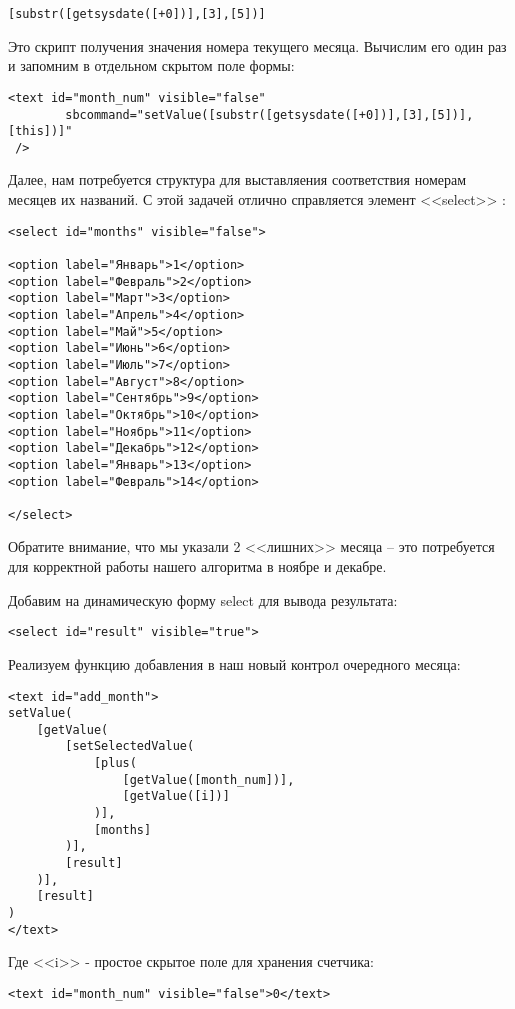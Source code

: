 \documentclass[../index.tex]{subfiles}
\begin{document}
\begin{verbatim}
[substr([getsysdate([+0])],[3],[5])]
\end{verbatim}

Это скрипт получения значения номера текущего месяца.
Вычислим его один раз и запомним в отдельном скрытом поле формы:

\begin{verbatim}
<text id="month_num" visible="false"
        sbcommand="setValue([substr([getsysdate([+0])],[3],[5])],[this])]" 
 />
\end{verbatim}

Далее, нам потребуется структура для выставляения соответствия номерам месяцев их названий. С этой задачей отлично справляется элемент <<select>> :

\begin{verbatim}
<select id="months" visible="false"> 

<option label="Январь">1</option>
<option label="Февраль">2</option>
<option label="Март">3</option>
<option label="Апрель">4</option>
<option label="Май">5</option>
<option label="Июнь">6</option>
<option label="Июль">7</option>
<option label="Август">8</option>
<option label="Сентябрь">9</option>
<option label="Октябрь">10</option>
<option label="Ноябрь">11</option>
<option label="Декабрь">12</option>
<option label="Январь">13</option>
<option label="Февраль">14</option>

</select>
\end{verbatim}

Обратите внимание, что мы указали 2 <<лишних>> месяца -- это потребуется для корректной работы нашего алгоритма в ноябре и декабре.

Добавим на динамическую форму select для вывода результата:
\begin{verbatim}
<select id="result" visible="true"> 
\end{verbatim}

Реализуем функцию добавления в наш новый контрол очередного месяца:

\begin{verbatim}
<text id="add_month">
setValue(
    [getValue(
        [setSelectedValue(
            [plus(
                [getValue([month_num])],
                [getValue([i])]
            )], 
            [months]
        )],
        [result]
    )],
    [result]
)
</text>
\end{verbatim}

Где <<i>> - простое скрытое поле для хранения счетчика:
\begin{verbatim}
<text id="month_num" visible="false">0</text>
\end{verbatim}
\end{document}
